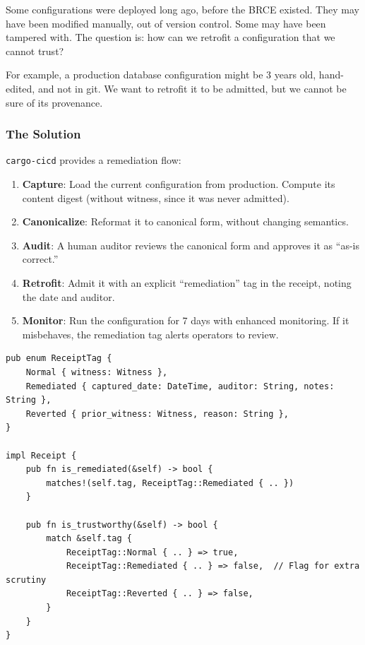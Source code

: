 Some configurations were deployed long ago, before the BRCE existed. They may have been modified manually, out of version control. Some may have been tampered with. The question is: how can we retrofit a configuration that we cannot trust?

For example, a production database configuration might be 3 years old, hand-edited, and not in git. We want to retrofit it to be admitted, but we cannot be sure of its provenance.

\subsubsection{The Solution}

\texttt{cargo-cicd} provides a remediation flow:

\begin{enumerate}
  \item \textbf{Capture}: Load the current configuration from production. Compute its content digest (without witness, since it was never admitted).
  \item \textbf{Canonicalize}: Reformat it to canonical form, without changing semantics.
  \item \textbf{Audit}: A human auditor reviews the canonical form and approves it as ``as-is correct.''
  \item \textbf{Retrofit}: Admit it with an explicit ``remediation'' tag in the receipt, noting the date and auditor.
  \item \textbf{Monitor}: Run the configuration for 7 days with enhanced monitoring. If it misbehaves, the remediation tag alerts operators to review.
\end{enumerate}

\begin{lstlisting}[caption={Remediation flow for untrusted configs}]
pub enum ReceiptTag {
    Normal { witness: Witness },
    Remediated { captured_date: DateTime, auditor: String, notes: String },
    Reverted { prior_witness: Witness, reason: String },
}

impl Receipt {
    pub fn is_remediated(&self) -> bool {
        matches!(self.tag, ReceiptTag::Remediated { .. })
    }

    pub fn is_trustworthy(&self) -> bool {
        match &self.tag {
            ReceiptTag::Normal { .. } => true,
            ReceiptTag::Remediated { .. } => false,  // Flag for extra scrutiny
            ReceiptTag::Reverted { .. } => false,
        }
    }
}
\end{lstlisting}

